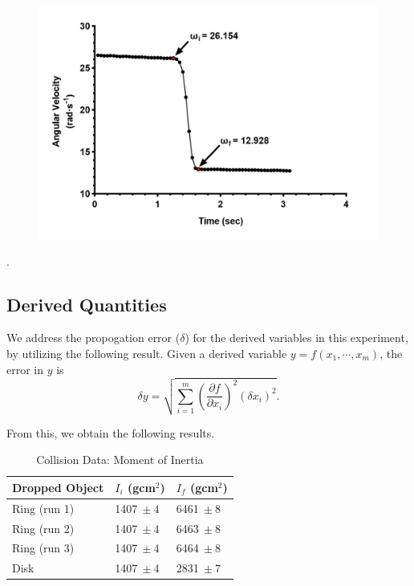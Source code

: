 \begin{figure}[!htb]
\begin{minipage}{.5\textwidth}
	\label{fig:test2}
\end{minipage}%
	\begin{minipage}{.5\textwidth}
	\centering
	\includegraphics[width=\linewidth]{d}
	\label{fig:test2}
\end{minipage}
\end{figure}
\newpage
.
\subsection{Derived Quantities}
We address the propogation error ($\delta$) for the derived variables in this experiment, by utilizing the following result. Given a derived variable $y=f(x_1,\cdots,x_m)$, the error in $y$ is
$$
\delta y=\sqrt{\sum_{i=1}^{m}\left(\frac{\partial f}{\partial x_{i}}\right)^{2}\left(\delta x_{i}\right)^{2}}.$$

From this, we obtain the following results.

\begin{table}[!htb]
	\centering
	\begin{tabular}{@{}lll@{}}
		\toprule
		Dropped Object & $I_i$ (gcm$^2$) & $I_f$ (gcm$^2$) \\ \midrule
		\multicolumn{1}{l|}{Ring (run 1)} & \multicolumn{1}{l|}{1407$\ \pm 4$} & 6461$\ \pm 8$ \\
		\multicolumn{1}{l|}{Ring (run 2)} & \multicolumn{1}{l|}{1407$\ \pm 4$} & 6463$\ \pm 8$ \\
		\multicolumn{1}{l|}{Ring (run 3)} & \multicolumn{1}{l|}{1407$\ \pm 4$} & 6464$\ \pm 8$ \\
		\multicolumn{1}{l|}{Disk} & \multicolumn{1}{l|}{1407$\ \pm 4$} & 2831$\ \pm 7$ \\ \bottomrule
	\end{tabular}
\caption{Collision Data: Moment of Inertia}
\end{table}


